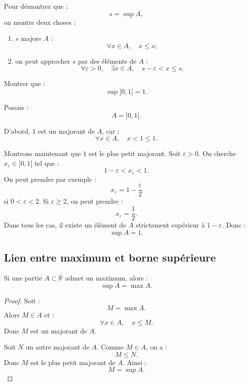 \documentclass[11pt,a4paper]{article}
\newcommand{\R}{\mathbb R}
\begin{document}
\begin{methodbox}[Montrer que \(s=\sup A\)]
Pour démontrer que :
\[
s=\sup A,
\]
on montre deux choses :
\begin{enumerate}
    \item \(s\) majore \(A\) :
    \[
    \forall x\in A,\quad x\leq s ;
    \]
    \item on peut approcher \(s\) par des éléments de \(A\) :
    \[
    \forall \varepsilon>0,\quad \exists x\in A,\quad s-\varepsilon<x\leq s.
    \]
\end{enumerate}
\end{methodbox}

\begin{exercicebox}
Montrer que :
\[
\sup ]0,1[=1.
\]
\end{exercicebox}

\begin{correctionbox}
Posons :
\[
A=]0,1[.
\]

D'abord, \(1\) est un majorant de \(A\), car :
\[
\forall x\in A,\quad x<1\leq1.
\]

Montrons maintenant que \(1\) est le plus petit majorant.  
Soit \(\varepsilon>0\).  
On cherche \(x_\varepsilon\in]0,1[\) tel que :
\[
1-\varepsilon<x_\varepsilon<1.
\]
On peut prendre par exemple :
\[
x_\varepsilon=1-\frac{\varepsilon}{2}
\]
si \(0<\varepsilon<2\).  
Si \(\varepsilon\geq2\), on peut prendre :
\[
x_\varepsilon=\frac12.
\]
Dans tous les cas, il existe un élément de \(A\) strictement supérieur à \(1-\varepsilon\).  
Donc :
\[
\sup A=1.
\]
\end{correctionbox}

\subsection{Lien entre maximum et borne supérieure}

\begin{theorembox}
Si une partie \(A\subset\R\) admet un maximum, alors :
\[
\sup A=\max A.
\]
\end{theorembox}

\begin{proof}
Soit :
\[
M=\max A.
\]
Alors \(M\in A\) et :
\[
\forall x\in A,\quad x\leq M.
\]
Donc \(M\) est un majorant de \(A\).

Soit \(N\) un autre majorant de \(A\).  
Comme \(M\in A\), on a :
\[
M\leq N.
\]
Donc \(M\) est le plus petit majorant de \(A\).  
Ainsi :
\[
M=\sup A.
\]
\end{proof}
\end{document}
